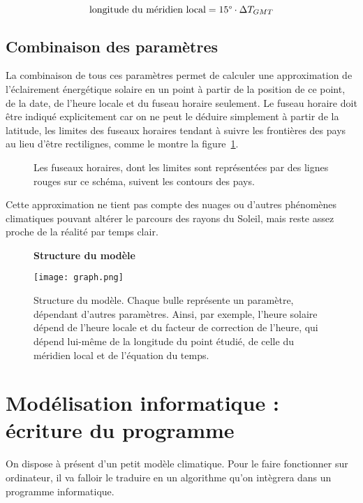 \documentclass[12pt]{article}
\begin{document}
\[
	\text{longitude du méridien local} = 15 \degree \cdot \Delta T_{GMT}
\]


\subsection{Combinaison des paramètres}
La combinaison de tous ces paramètres permet de calculer une approximation de l'éclairement énergétique solaire en un point à partir de la position de ce point, de la date, de l'heure locale et du fuseau horaire seulement.
Le fuseau horaire doit être indiqué explicitement car on ne peut le déduire simplement à partir de la latitude, les limites des fuseaux horaires tendant à suivre les frontières des pays au lieu d'être rectilignes, comme le montre la figure~\ref{fig:timezones}.

\begin{figure}[!ht]
  \centering
  \caption{Les fuseaux horaires, dont les limites sont représentées par des lignes rouges sur ce schéma, suivent les contours des pays.}
  \label{fig:timezones}
\end{figure}

Cette approximation ne tient pas compte des nuages ou d'autres phénomènes climatiques pouvant altérer le parcours des rayons du Soleil, mais reste assez proche de la réalité par temps clair.

\clearpage
\begin{figure}[!htb]
	\centering
	{ \Large \textbf{Structure du modèle} \par\medskip }
	\centerline{\texttt{[image: graph.png]}}
	\caption{Structure du modèle. Chaque bulle représente un paramètre, dépendant d'autres paramètres. Ainsi, par exemple, l'heure solaire dépend de l'heure locale et du facteur de correction de l'heure, qui dépend lui-même de la longitude du point étudié, de celle du méridien local et de l'équation du temps.}
	\label{fig:model-structure}
\end{figure}



\section{Modélisation informatique : écriture du programme}

On dispose à présent d'un petit modèle climatique.
Pour le faire fonctionner sur ordinateur, il va falloir le traduire en un algorithme qu'on intègrera dans un programme informatique.
\end{document}
